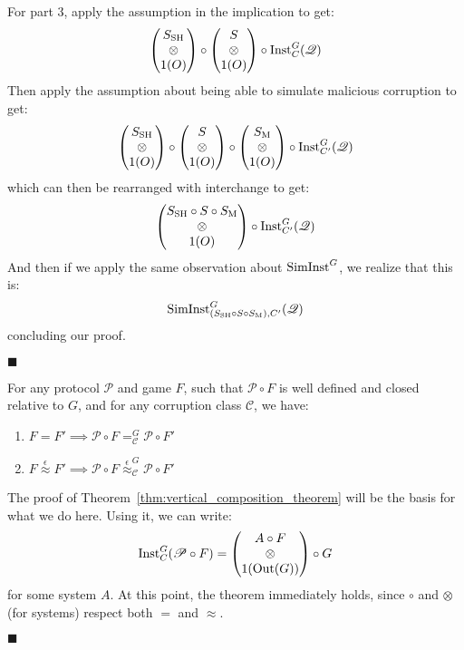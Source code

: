 \begin{theorem}
  For part 3, apply the assumption in the implication to get:
  $$
  \begin{pmatrix}
    S_{\text{SH}}\cr
    \otimes\cr
    1(O)
  \end{pmatrix}
  \circ
  \begin{pmatrix}
    S\cr
    \otimes\cr
    1(O)
  \end{pmatrix}
  \circ
  \text{Inst}^G_C(\mathscr{Q})
  $$
  Then apply the assumption about being able to simulate malicious corruption to
  get:
  $$
  \begin{pmatrix}
    S_{\text{SH}}\cr
    \otimes\cr
    1(O)
  \end{pmatrix}
  \circ
  \begin{pmatrix}
    S\cr
    \otimes\cr
    1(O)
  \end{pmatrix}
  \circ
  \begin{pmatrix}
    S_{\text{M}}\cr
    \otimes\cr
    1(O)
  \end{pmatrix}
  \circ
  \text{Inst}^G_{C'}(\mathscr{Q})
  $$
  which can then be rearranged with interchange to get:
  $$
  \begin{pmatrix}
    S_{\text{SH}} \circ S \circ S_{\text{M}}\cr
    \otimes\cr
    1(O)
  \end{pmatrix}
  \circ
  \text{Inst}^G_{C'}(\mathscr{Q})
  $$
  And then if we apply the same observation about $\text{SimInst}^G$, we realize
  that this is:
  $$
  \text{SimInst}^G_{(S_{\text{SH}} \circ S \circ S_{\text{M}}), C'}(\mathscr{Q})
  $$
  concluding our proof.

  $\blacksquare$
\end{theorem}

\begin{theorem}
  For any protocol $\mathscr{P}$ and game $F$, such that $\mathscr{P} \circ F$
  is well defined and closed relative to $G$, and for any corruption class $\mathscr{C}$, we have:
  \begin{enumerate}
    \item $F = F' \implies \mathscr{P} \circ F =^G_{\mathscr{C}} \mathscr{P} \circ F'$
    \item $F \overset{\epsilon}{\approx} F' \implies \mathscr{P} \circ F \overset{\epsilon}{\approx}^G_{\mathscr{C}} \mathscr{P} \circ F'$
  \end{enumerate}

   The proof of Theorem~\ref{thm:vertical_composition_theorem} will be the basis
  for what we do here.
  Using it, we can write:
  $$
  \text{Inst}^G_C(\mathscr{P} \circ F) =
  \begin{pmatrix}
    A \circ F\cr
    \otimes\cr
    1(\text{Out}(G))
  \end{pmatrix}
  \circ G
  $$
  for some system $A$.
  At this point, the theorem immediately holds, since $\circ$ and $\otimes$ (for systems)
  respect both $=$ and $\approx$.

  $\blacksquare$
\end{theorem}

